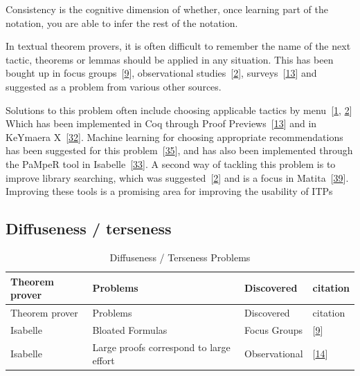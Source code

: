 \documentclass[
]{article}
\begin{document}
Consistency is the cognitive dimension of whether, once learning part of
the notation, you are able to infer the rest of the notation.

In textual theorem provers, it is often difficult to remember the name
of the next tactic, theorems or lemmas should be applied in any
situation. This has been bought up in focus
groups~{[}\protect\hyperlink{ref-beckert_usability_2015}{9}{]},
observational
studies~{[}\protect\hyperlink{ref-aitken_analysis_2000}{2}{]},
surveys~{[}\protect\hyperlink{ref-berman_development_2014}{13}{]} and
suggested as a problem from various other sources.

Solutions to this problem often include choosing applicable tactics by
menu~{[}\protect\hyperlink{ref-aitken_interactive_1998}{1},
\protect\hyperlink{ref-aitken_analysis_2000}{2}{]} Which has been
implemented in Coq through Proof
Previews~{[}\protect\hyperlink{ref-berman_development_2014}{13}{]} and
in KeYmaera X~{[}\protect\hyperlink{ref-mitsch_keymaera_2017}{32}{]}.
Machine learning for choosing appropriate recommendations has been
suggested for this
problem~{[}\protect\hyperlink{ref-ringer_replica_2020}{35}{]}, and has
also been implemented through the PaMpeR tool in
Isabelle~{[}\protect\hyperlink{ref-nagashima_pamper_2018}{33}{]}. A
second way of tackling this problem is to improve library searching,
which was
suggested~{[}\protect\hyperlink{ref-aitken_analysis_2000}{2}{]} and is a
focus in
Matita~{[}\protect\hyperlink{ref-tassi_interactive_2008}{39}{]}.
Improving these tools is a promising area for improving the usability of
ITPs

\hypertarget{diffuseness-terseness}{%
\subsection{Diffuseness / terseness}\label{diffuseness-terseness}}

\hypertarget{tbl:diffuseness}{}
\begin{longtable}[]{@{}llll@{}}
\caption{\label{tbl:diffuseness}Diffuseness / Terseness
Problems}\tabularnewline
\toprule
Theorem prover & Problems & Discovered & citation \\
\midrule
\endfirsthead
\toprule
Theorem prover & Problems & Discovered & citation \\
\midrule
\endhead
Isabelle & Bloated Formulas & Focus Groups &
{[}\protect\hyperlink{ref-beckert_usability_2015}{9}{]} \\
Isabelle & Large proofs correspond to large effort & Observational &
{[}\protect\hyperlink{ref-bourke_challenges_2012}{14}{]} \\
\bottomrule
\end{longtable}
\end{document}
